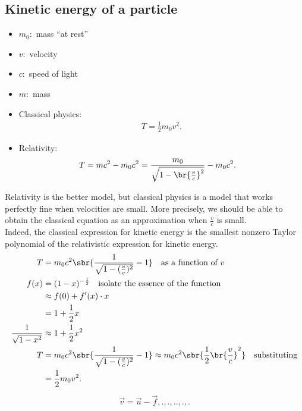 \subsection*{Kinetic energy of a particle}
\begin{itemize}
    \item $m_0: $ mass ``at rest''
    \item $v: $ velocity
    \item $c: $ speed of light
    \item $m: $ mass
\end{itemize}
\begin{itemize}
    \item Classical physics:
        \begin{align*}
            T = \frac{1}{2} m_0 v^2
        .\end{align*}
    \item Relativity:
        \begin{align*}
            T &= mc^2 - m_0 c^2 = \frac{m_0}{\sqrt{1-\br{\frac{v}{c}}^2} } - m_0 c^2
        .\end{align*}
\end{itemize}
Relativity is the better model, but classical physics is a model that works perfectly fine when velocities are small. More precisely, we should be able to obtain the classical equation as an approximation when $\frac{v}{c}$ is small.\\
Indeed, the classical expression for kinetic energy is the smallest nonzero Taylor polynomial of the relativistic expression for kinetic energy. 
\begin{align*}
    T &= m_0 c^2 \sbr{\frac{1}{\sqrt{1 - (\frac{v}{c})^2} } - 1} \quad \text{as a function of $v$} \\
    f(x) &= (1-x)^{-\frac{1}{2}} \quad \text{isolate the essence of the function} \\
         &\approx f(0) + f'(x) \cdot x \\
         &= 1 + \frac{1}{2} x \\
         \frac{1}{\sqrt{1-x^2} } &\approx 1 + \frac{1}{2} x^2    \\
         T &= m_0 c^2 \sbr{\frac{1}{\sqrt{1 - (\frac{v}{c})^2} } - 1}\approx m_0 c^2 \sbr{\frac{1}{2}\br{\frac{v}{c}}^2} \quad \text{substituting} \\
           &= \frac{1}{2}m_0 v^2    
.\end{align*}
\begin{align*}
    \vec{v} = \vec{u} - \vec{f},.,.,..,.,
.\end{align*}

